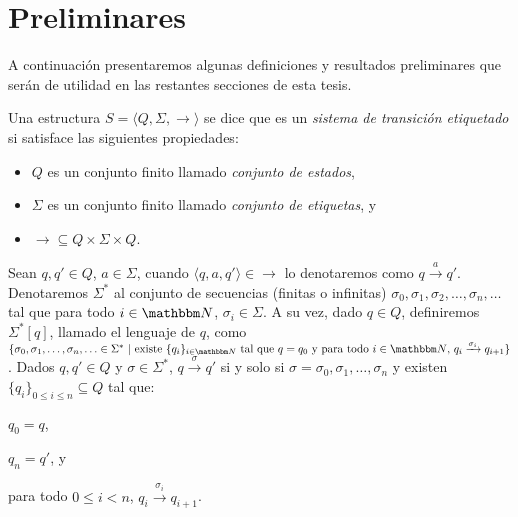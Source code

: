 \chapter{Preliminares}
\label{preliminares}
A continuación presentaremos algunas definiciones y resultados preliminares que serán de utilidad en las restantes secciones de esta tesis.


\begin{definition} \label{def:LTS}
Una estructura $S = \langle Q, \Sigma, \longrightarrow \rangle$ se dice que es un \emph{sistema de transición etiquetado} si satisface las siguientes propiedades:
\begin{itemize}
\item $Q$ es un conjunto finito llamado \emph{conjunto de estados},
\item $\Sigma$ es un conjunto finito llamado \emph{conjunto de etiquetas}, y
\item $\longrightarrow \subseteq Q \times \Sigma \times Q$.
\end{itemize}
Sean $q, q' \in Q$, $a \in \Sigma$, cuando $\langle q, a, q' \rangle \in \longrightarrow$ lo denotaremos como $q \xrightarrow{a} q'$. Denotaremos $\Sigma^*$ al conjunto de secuencias (finitas o infinitas) $\sigma_0, \sigma_1, \sigma_2, \ldots, \sigma_n, \ldots$ tal que para todo $i \in \nat$, $\sigma_i \in \Sigma$. A su vez, dado $q \in Q$, definiremos $\Sigma^* [q]$, llamado el lenguaje de $q$, como $\{ \sigma_0, \sigma_1, \ldots, \sigma_n, \ldots \in \Sigma^*\ |\ \text{existe } \{q_i\}_{i \in \nat} \text{ tal que } q = q_0 \text{ y para todo } i \in \nat \text{, } q_i \xrightarrow{\sigma_i} q_{i+1}\}$. Dados $q, q' \in Q$ y $\sigma \in \Sigma^*$, $q \xrightarrow{\sigma} q'$ si y solo si $\sigma = \sigma_0, \sigma_1, \ldots, \sigma_n$ y existen $\{q_i\}_{0 \leq i \leq n} \subseteq Q$ tal que:
\begin{inparaenum}[1-]
\item $q_0 = q$,
\item $q_n = q'$, y
\item para todo $0 \leq i < n$, $q_i \xrightarrow{\sigma_i} q_{i+1}$.
\end{inparaenum}
\end{definition}

